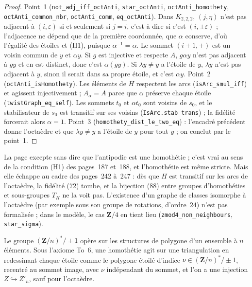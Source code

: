 \begin{proof}
Point~1 (\texttt{not\_adj\_iff\_octAnti}, \texttt{star\_octAnti}, \texttt{octAnti\_homothety}, \texttt{octAnti\_common\_nbr}, \texttt{octAnti\_comm}, \texttt{eq\_octAnti}). Dans $K_{2,2,2}$, $(j, \eta)$ n'est pas adjacent à $(i, \varepsilon)$ si et seulement si $j = i$, c'est-à-dire si c'est $(i, \pm\varepsilon)$ ; l'adjacence ne dépend que de la première coordonnée, que $\alpha$ conserve, d'où l'égalité des étoiles et (H1), puisque $\alpha^{-1} = \alpha$. Le sommet $(i + 1, +)$ est un voisin commun de $y$ et $\alpha y$. Si $g$ est injective et respecte $A$, $g\alpha y$ n'est pas adjacent à $gy$ et en est distinct, donc c'est $\alpha(gy)$. Si $\lambda y \neq y$ a l'étoile de $y$, $\lambda y$ n'est pas adjacent à $y$, sinon il serait dans sa propre étoile, et c'est $\alpha y$. Point~2 (\texttt{octAnti\_isHomothety}). Les éléments de $H$ respectent les arcs (\texttt{isArc\_smul\_iff}) et agissent injectivement ; $A_\alpha = A$ parce que $\alpha$ préserve chaque étoile (\texttt{twistGraph\_eq\_self}). Les sommets $t_0$ et $\alpha t_0$ sont voisins de $s_0$, et le stabilisateur de $s_0$ est transitif sur ses voisins (\texttt{IsArc.stab\_trans}) ; la fidélité forcerait alors $\alpha = 1$. Point~3 (\texttt{homothety\_dist\_le\_two\_eq}) : l'encadré précédent donne l'octaèdre et que $\lambda y \neq y$ a l'étoile de $y$ pour tout $y$ ; on conclut par le point~1.
\end{proof}

\begin{remarque}
La page excepte  sans dire que l'antipodie est une homothétie ; c'est vrai au sens de la condition (H1) des pages~187 et~188, et l'homothétie est même stricte. Mais elle échappe au cadre des pages~242 à~247 : dès que $H$ est transitif sur les arcs de l'octaèdre, la fidélité (72) tombe, et la bijection (88) entre groupes d'homothéties et sous-groupes $T_H$ ne la voit pas. L'existence d'un graphe de classes isomorphe à l'octaèdre (par exemple sous son groupe de rotations, d'ordre~$24$) n'est pas formalisée ; dans le modèle, le cas $\mathbf Z/4$ en tient lieu (\texttt{zmod4\_non\_neighbours}, \texttt{star\_sigma}).
\end{remarque}

\begin{encadre}
\begin{theoreme}
Le groupe $(\mathbf Z/n)^*/\pm 1$ opère sur les structures de polygone d'un ensemble à $n$ éléments. Sous l'axiome To~6, une homothétie agit sur une triangulation en redessinant chaque étoile comme le polygone étoilé d'indice $\nu \in (\mathbf Z/n)^*/\pm 1$, recentré au sommet image, avec $\nu$ indépendant du sommet, et l'on a une injection $Z \hookrightarrow Z'_n$, sauf pour l'octaèdre.
\end{theoreme}
\end{encadre}

